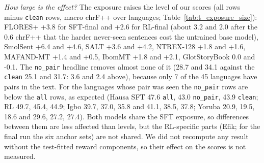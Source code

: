 \emph{How large is the effect?} The exposure raises the level of our scores (all rows minus \texttt{clean} rows, macro chrF++ over languages; Table~\ref{tab:t_exposure_size}): FLORES+ +3.8 for SFT-final and +2.6 for RL-final (about 3.2 and 2.0 after the 0.6 chrF++ that the harder never-seen sentences cost the untrained base model), SmolSent +6.4 and +4.6, SALT +3.6 and +4.2, NTREX-128 +1.8 and +1.6, MAFAND-MT +1.4 and +0.5, IbomMT +1.8 and +2.1, GlotStoryBook 0.0 and -0.1. The \texttt{no\_pair} headline removes almost none of it (28.7 and 34.1 against the \texttt{clean} 25.1 and 31.7: 3.6 and 2.4 above), because only 7 of the 45 languages have pairs in the text. For the languages whose pair was seen the \texttt{no\_pair} rows are below the \texttt{all} rows, as expected (Hausa SFT 47.6 \texttt{all}, 43.0 \texttt{no\_pair}, 43.9 \texttt{clean}; RL 49.7, 45.4, 44.9; Igbo 39.7, 37.0, 35.8 and 41.1, 38.5, 37.8; Yoruba 20.9, 19.5, 18.6 and 29.6, 27.2, 27.4). Both models share the SFT exposure, so differences between them are less affected than levels, but the RL-specific parts (Efik; for the final run the six anchor sets) are not shared. We did not recompute any result without the test-fitted reward components, so their effect on the scores is not measured.


